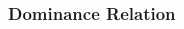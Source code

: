 \documentclass[aspectratio=169]{beamer}
\begin{document}
\begin{frame}\frametitle{Dominance Relation}
\begin{columns}
\begin{column}{.5\textwidth}
\begin{center}

\vskip -2.3in


\end{center}
\end{column}
\end{columns}
\end{frame}
\end{document}
